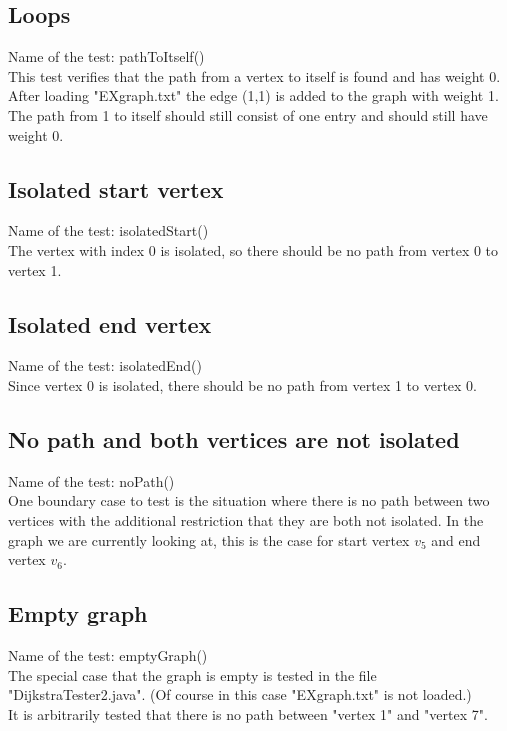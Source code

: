 \documentclass{article}
\begin{document}
\subsection{Loops}
Name of the test: pathToItself()\\
This test verifies that the path from a vertex to itself is found and has weight 0. \\
After loading "EXgraph.txt" the edge (1,1) is added to the graph with weight 1. The path from 1 to itself should still consist of one entry and should still have weight 0.
\subsection{Isolated start vertex}
Name of the test: isolatedStart() \\
The vertex with index 0 is isolated, so there should be no path from vertex 0 to vertex 1.
\subsection{Isolated end vertex}
Name of the test: isolatedEnd() \\
Since vertex 0 is isolated, there should be no path from vertex 1 to vertex 0.
\subsection{No path and both vertices are not isolated}
Name of the test: noPath() \\
One boundary case to test is the situation where there is no path between two vertices with the additional restriction that they are both not isolated. In the graph we are currently looking at, this is the case for start vertex $v_5$ and end vertex $v_6$.

\subsection{Empty graph}
Name of the test: emptyGraph() \\
The special case that the graph is empty is tested in the file "DijkstraTester2.java". (Of course in this case "EXgraph.txt" is not loaded.) \\
It is arbitrarily tested that there is no path between "vertex 1" and "vertex 7".
\end{document}
